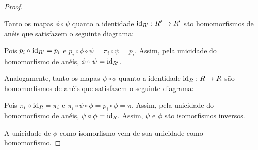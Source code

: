 \begin{proof}
    \begin{figure}[H]
        \centering
    \end{figure}

    Tanto os mapas $\phi\circ \psi$ quanto a identidade $\operatorname{id}_{R'}:R'\rightarrow R'$ são homomorfismos de anéis que satisfazem o seguinte diagrama:

    \begin{figure}[H]
        \centering
    \end{figure}

    Pois $p_i\circ \operatorname{id}_{R'}=p_i$ e $p_i\circ \phi\circ\psi=\pi_i\circ \psi=p_i$.
    Assim, pela unicidade do homomorfismo de anéis, $\phi\circ \psi=\operatorname{id}_{R'}$.

    Analogamente, tanto os mapas $\psi\circ \phi$ quanto a identidade $\operatorname{id}_{R}:R\rightarrow R$ são homomorfismos de anéis que satisfazem o seguinte diagrama:
    \begin{figure}[H]
        \centering
    \end{figure}

    Pois $\pi_i\circ \operatorname{id}_{R}=\pi_i$ e $\pi_i\circ \psi\circ\phi=p_i\circ \phi=\pi$.
    Assim, pela unicidade do homomorfismo de anéis, $\psi\circ \phi=\operatorname{id}_{R}$. Assim, $\psi$ e $\phi$ são isomorfismos inversos.

    A unicidade de $\phi$ como isomorfismo vem de sua unicidade como homomorfismo.
\end{proof}
